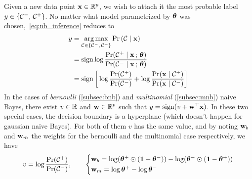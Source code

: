 Given a new data point $\mathbf{x} \in \mathbb{R}^p$, we wish to attach it the most probable label
$y \in \left\{ \mathcal{C}^-,\, \mathcal{C}^+ \right\}$.
No matter what model parametrized by $\bm{\theta}$ was chosen,~\ref{eq:nb_inference} reduces to
\begin{align*}
        y &= \underset{\mathcal{C} \in \left\{ \mathcal{C}^-,\, \mathcal{C}^+ \right\}}{\operatorname*{arg\,max}} \Pr\left( \mathcal{C} \mid \mathbf{x} \right)\\
        &= \operatorname*{sign} \log \frac{\Pr(\mathcal{C}^+ \mid \mathbf{x} \,;\,\bm{\theta})}{\Pr(\mathcal{C}^- \mid \mathbf{x} \,;\,\bm{\theta})}\\
        &= \operatorname*{sign}\bigg[\log \frac{\Pr(\mathcal{C}^+)}{\Pr(\mathcal{C}^-)}
                + \log \frac{\Pr(\mathbf{x} \mid \mathcal{C}^+)}{\Pr(\mathbf{x} \mid \mathcal{C}^-)}\bigg]
\end{align*}
In the cases of \emph{bernoulli} (\ref{subsec:bnb}) and \emph{multinomial} (\ref{subsec:mnb}) naive Bayes,
there exist $v \in \mathbb{R}$ and $\mathbf{w} \in \mathbb{R}^p$ such that $y = \operatorname*{sign}(v + \mathbf{w}^\top\mathbf{x})$.
In these two special cases, the decision boundary is a hyperplane (which doesn't happen for gaussian naive Bayes).
For both of them $v$ has the same value, and by noting $\mathbf{w}_b$ and $\mathbf{w}_m$ the weights for the bernoulli
and the multinomial case respectively, we have
\begin{equation*}
        v = \log\frac{\Pr(\cC^+)}{\Pr(\cC^-)}
        ,\qquad
        \begin{cases*}
                \ww_b = \log(\btheta^+\odot(\1 - \btheta^-)) - \log(\btheta^-\odot(\1 - \btheta^+))\\
                \ww_m = \log\btheta^+ - \log\btheta^-
        \end{cases*}
\end{equation*}

